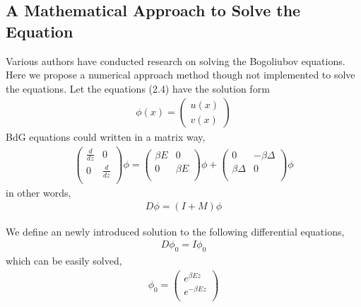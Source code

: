 \subsection{A Mathematical Approach to Solve the Equation}
Various authors have conducted research on solving the Bogoliubov equations\cite{Reference6,Reference4}. Here we propose a numerical approach method though not implemented to solve the equations. Let the equations (2.4) have the solution form
\begin{eqnarray}
\phi(x)=
\left(\begin{array}{c}
u(x)\\
v(x)
\end{array}\right)
\end{eqnarray}
BdG equations could written in a matrix way,
\begin{eqnarray}
\left(
\begin{array}{cc}
 \frac{d}{dz}& 0\\
 0& \frac{d}{dz}  \\
 
\end{array}
\right)\phi=
\left(
\begin{array}{cc}
 \beta E& 0\\
 0& \beta E  \\
 
\end{array}
\right)\phi+
\left(
\begin{array}{cc}
 0& -\beta \Delta\\
  \beta \Delta& 0  \\
 
\end{array}
\right)\phi
\end{eqnarray}
in other words,
\begin{eqnarray}
D\phi=(I+M)\phi
\end{eqnarray}

We define an newly introduced solution to the following differential equations,
\begin{eqnarray}
D\phi_0=I\phi_0
\end{eqnarray}
which can be easily solved,
\begin{eqnarray}
\phi_0=
\left(
\begin{array}{c}
 e^{\beta E z}\\
 e^{-\beta E z}  \\
 
\end{array}\right)
\end{eqnarray}

